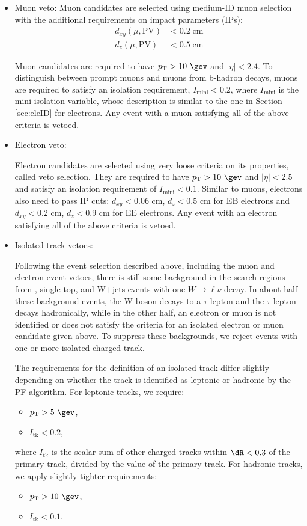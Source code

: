 \begin{itemize}
\item Muon veto:
  Muon candidates are selected using
  medium-ID muon selection \cite{Sirunyan:2018fpa} with the additional
  requirements on impact parameters (IPs):
  \begin{align}
    d_{xy}(\mu,\mathrm{PV}) &< 0.2\;\mathrm{cm}\nonumber\\
    d_{z}(\mu,\mathrm{PV}) &< 0.5\;\mathrm{cm}
  \end{align}

  Muon candidates are required to have $\pt>10\ \gev$ and $|\eta|<2.4$.
  To distinguish between prompt muons and muons from b-hadron
  decays, muons are required to satisfy an isolation requirement,
  $I_{\mathrm{mini}}<0.2$, where $I_{\mathrm{mini}}$ is the mini-isolation
  variable, whose description is similar to the one in Section \ref{sec:eleID} for electrons.
 Any event with a muon satisfying all of the  above criteria is vetoed.

\item Electron veto:

  Electron candidates are selected using very loose criteria on its properties, called veto selection.
  They are required to have $\pt>10\ \gev$ and $|\eta|<2.5$ and satisfy an isolation
  requirement of $I_{\mathrm{mini}}<0.1$. Similar to muons, electrons also need to
  pass IP cuts: $d_{xy} < 0.06$ cm, $d_{z} < 0.5$ cm for EB electrons
  and $d_{xy} < 0.2$ cm, $d_{z} < 0.9$ cm for EE electrons.  Any event with an electron satisfying all of the
  above criteria is vetoed.
\item Isolated track vetoes:
  
  Following the event selection described above,
  including the muon and electron event vetoes,
  there is still some background in the search regions from
  \ttbar, single-top, and W+jets events with one $W\rightarrow\ell\nu$
  decay.  In about half these background events, the W boson decays to a $\tau$ lepton
  and the $\tau$ lepton decays hadronically,
  while in the other half, an electron or muon is not identified
  or does not satisfy the criteria for an isolated electron or muon
  candidate given above.
  To suppress these backgrounds,
  we reject events with one or more isolated
  charged track.

  The requirements for the definition of an isolated track
  differ slightly depending on whether the track is identified
  as leptonic or hadronic by the PF algorithm.
  For leptonic tracks, we require:
  \begin{itemize}
  \item $\pt>5\ \gev$,
  \item $I_{\mathrm{tk}}<0.2$,
  \end{itemize}
  where $I_{\mathrm{tk}}$ is the scalar \pt sum of other
  charged tracks within $\dR<0.3$ of the primary track, divided
  by the \pt value of the primary track.
  For hadronic tracks, we apply slightly tighter requirements:
  \begin{itemize}
  \item $\pt>10\ \gev$,
  \item $I_{\mathrm{tk}}<0.1$.
  \end{itemize}


\end{itemize}
